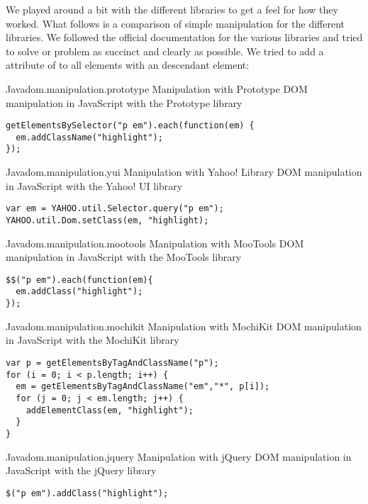 We played around a bit with the different libraries to get a feel for how
they worked. What follows is a comparison of simple  manipulation
for the different libraries. We followed the official documentation for the
various libraries and tried to solve or problem as succinct and clearly as
possible. We tried to add a  attribute of  to
all  elements with an descendant  element: 

\begin{scode}{Java}{dom.manipulation.prototype}{%
   Manipulation with Prototype}{%
  DOM manipulation in JavaScript with the Prototype library}
\begin{lstlisting}
getElementsBySelector("p em").each(function(em) {
  em.addClassName("highlight");
});
\end{lstlisting}
\end{scode}

\begin{scode}{Java}{dom.manipulation.yui}{%
   Manipulation with Yahoo!  Library}{%
  DOM manipulation in JavaScript with the Yahoo! UI library}
\begin{lstlisting}
var em = YAHOO.util.Selector.query("p em"); 
YAHOO.util.Dom.setClass(em, "highlight);
\end{lstlisting}
\end{scode}

\begin{scode}{Java}{dom.manipulation.mootools}{%
   Manipulation with MooTools}{%
  DOM manipulation in JavaScript with the MooTools library}
\begin{lstlisting}
$$("p em").each(function(em){
  em.addClass("highlight");
});
\end{lstlisting}
\end{scode}

\begin{scode}{Java}{dom.manipulation.mochikit}{%
   Manipulation with MochiKit}{%
  DOM manipulation in JavaScript with the MochiKit library}
\begin{lstlisting}
var p = getElementsByTagAndClassName("p");
for (i = 0; i < p.length; i++) {
  em = getElementsByTagAndClassName("em","*", p[i]);
  for (j = 0; j < em.length; j++) {
    addElementClass(em, "highlight");
  }
}
\end{lstlisting}
\end{scode}

\begin{scode}{Java}{dom.manipulation.jquery}{%
   Manipulation with jQuery}{%
  DOM manipulation in JavaScript with the jQuery library}
\begin{lstlisting}
$("p em").addClass("highlight");
\end{lstlisting}
\end{scode}

